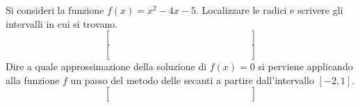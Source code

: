 Si consideri la funzione $f(x)=x^2-4x-5$. Localizzare le radici e 
scrivere gli intervalli in cui si trovano.
\medskip
\[
\left [
\begin{array}{cccccccccccccc}
\quad &  \quad & \quad &  \quad & \quad & \quad & \quad & \quad  \\
\quad &  \quad & \quad &  \quad & \quad &  \quad & \quad & \quad \\
\quad &  \quad & \quad &  \quad  & \quad  & \quad & \quad & \quad
\end{array}\right]
\]
\medskip
\[
\left [
\begin{array}{cccccccccccccc}
\quad &  \quad & \quad &  \quad & \quad & \quad & \quad & \quad  \\
\quad &  \quad & \quad &  \quad & \quad &  \quad & \quad & \quad \\
\quad &  \quad & \quad &  \quad  & \quad  & \quad & \quad & \quad
\end{array}\right]
\]
\noindent Dire a quale approssimazione della soluzione di $f(x)=0$ 
si perviene applicando alla funzione $f$ un passo del metodo delle 
secanti a partire dall'intervallo $[-2,1]$.
\medskip
\[
\left [
\begin{array}{cccccccccccccc}
\quad &  \quad & \quad &  \quad & \quad & \quad & \quad & \quad  \\
\quad &  \quad & \quad &  \quad & \quad &  \quad & \quad & \quad \\
\quad &  \quad & \quad &  \quad  & \quad  & \quad & \quad & \quad
\end{array}\right]
\]
